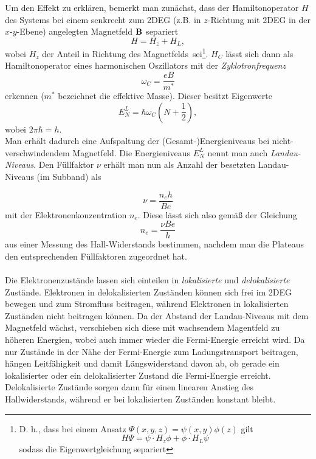 Um den Effekt zu erklären, bemerkt man zunächst, dass der Hamiltonoperator $H$ des Systems bei einem senkrecht zum 2DEG (z.B. in $z$-Richtung mit 2DEG in der $x$-$y$-Ebene) angelegten Magnetfeld $\textbf{B}$ separiert
$$ H = H_z + H_L, $$
wobei $H_z$ der Anteil \glqq in Richtung des Magnetfelds\grqq\ sei\footnote{D. h., dass bei einem Ansatz $\Psi(x,y,z) = \psi(x,y)\phi(z)$ gilt $$H\Psi = \psi\cdot H_z\phi + \phi\cdot H_L\psi$$ sodass die Eigenwertgleichung separiert}.
$H_C$ lässt sich dann als Hamiltonoperator eines harmonischen Oszillators mit der \emph{Zyklotronfrequenz}
$$\omega_C = \frac{eB}{m^*}$$
erkennen ($m^*$ bezeichnet die effektive Masse).
Dieser besitzt Eigenwerte
$$ E_N^L = \hbar \omega_C(N + \frac{1}{2}), $$
wobei $2\pi\hbar = h$.\\
Man erhält dadurch eine Aufspaltung der (Gesamt-)Energieniveaus bei nicht-verschwindendem Magnetfeld. 
Die Energieniveaus $E_N^L$ nennt man auch \emph{Landau-Niveaus}.
Den Füllfaktor $\nu$ erhält man nun als Anzahl der besetzten Landau-Niveaus (im Subband) als

\begin{equation}\label{eq:Fuellfaktor}
\nu = \frac{n_eh}{Be}
\end{equation}
mit der Elektronenkonzentration $n_e$. Diese lässt sich also gemäß der Gleichung
\begin{equation}\label{eq:ElektrKonz1}
n_e = \frac{\nu Be}{h}
\end{equation}
aus einer Messung des Hall-Widerstands bestimmen, nachdem man die Plateaus den entsprechenden Füllfaktoren zugeordnet hat.
\\\\
Die Elektronenzustände lassen sich einteilen in \emph{lokalisierte} und \emph{delokalisierte} Zustände.
Elektronen in delokalisierten Zuständen können sich frei im 2DEG bewegen und zum Stromfluss beitragen, während Elektronen in lokalisierten Zuständen nicht beitragen können. 
Da der Abstand der Landau-Niveaus mit dem Magnetfeld wächst, verschieben sich diese mit wachsendem Magentfeld zu höheren Energien, wobei auch immer wieder die Fermi-Energie erreicht wird.
Da nur Zustände in der Nähe der Fermi-Energie zum Ladungstransport beitragen, hängen Leitfähigkeit und damit Längswiderstand davon ab, ob gerade ein lokalisierter oder ein delokalisierter Zustand die Fermi-Energie erreicht. Delokalisierte Zustände sorgen dann für einen linearen Anstieg des Hallwiderstands, während er bei lokalisierten Zuständen konstant bleibt. 
\\

